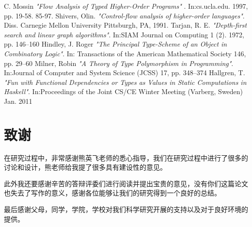 \documentclass[UTF8, colorlinks]{pkuthss}
\begin{document}
	\begin{thebibliography}{1}
		 C. Mossin {\em "Flow Analysis of Typed Higher-Order Programs"} . In:cs.ucla.edu. 1997, pp. 19-58. 85-97.
		 Shivers, Olin. {\em "Control-flow analysis of higher-order languages"}. Diss. Carnegie Mellon University Pittsburgh, PA, 1991.
		 Tarjan, R. E. {\em  "Depth-first search and linear graph algorithms"}. In:SIAM Journal on Computing 1 (2). 1972, pp. 146–160
		 Hindley, J. Roger {\em "The Principal Type-Scheme of an Object in Combinatory Logic"}. In: Transactions of the American Mathematical Society 146, pp. 29–60
		 Milner, Robin {\em "A Theory of Type Polymorphism in Programming"}. In:Journal of Computer and System Science (JCSS) 17, pp. 348–374
		 Hallgren, T.  {\em "Fun with Functional Dependencies or Types as Values in Static Computations in Haskell"}. In:Proceedings of the Joint CS/CE Winter Meeting (Varberg, Sweden) Jan. 2011
	\end{thebibliography}
	
	\backmatter
	\chapter{致谢}
	在研究过程中，非常感谢熊英飞老师的悉心指导，我们在研究过程中进行了很多的讨论和设计，熊老师给我提了很多具有建设性的意见。
	
	此外我还要感谢辛苦的答辩评委们进行阅读并提出宝贵的意见，没有你们这篇论文也失去了写作的意义，感谢各位能够让我们的研究得到一个良好的总结。
	
	最后感谢父母，同学，学院，学校对我们科学研究开展的支持以及对于良好环境的提供。
	
\end{document}
